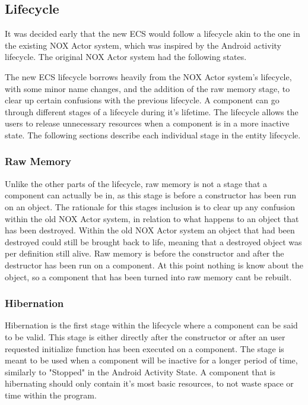 \subsection{Lifecycle}
It was decided early that the new ECS would follow a lifecycle akin to the one in the existing NOX Actor system,
which was inspired by the Android activity lifecycle. \cite{android_activity_lifecycle} 
The original NOX Actor system had the following states.

The new ECS lifecycle borrows heavily from the NOX Actor system's lifecycle, with some minor name changes,
and the addition of the raw memory stage, to clear up certain confusions with the previous lifecycle.
A component can go through different stages of a lifecycle during it's lifetime.
The lifecycle allows the users to release unnecessary resources when a component is in a more inactive state.
The following sections describe each individual stage in the entity lifecycle.

\subsubsection{Raw Memory}
Unlike the other parts of the lifecycle, raw memory is not a stage that a component can actually be in,
as this stage is before a constructor has been run on an object.
The rationale for this stages inclusion is to clear up any confusion within the old NOX Actor system,
in relation to what happens to an object that has been destroyed.
Within the old NOX Actor system an object that had been destroyed could still be brought back to life,
meaning that a destroyed object was per definition still alive.
Raw memory is before the constructor and after the destructor has been run on a component.
At this point nothing is know about the object, so a component that has been turned into raw memory cant be rebuilt.

\subsubsection{Hibernation}
Hibernation is the first stage within the lifecycle where a component can be said to be valid.
This stage is either directly after the constructor or after an  user requested initialize function has been executed on a component.
The stage is meant to be used when a component will be inactive for a longer period of time, similarly to "Stopped" in the Android Activity State.\cite[Activity state and ejection from memory]{android_activity_lifecycle}
A component that is hibernating should only contain it's most basic resources, to not waste space or time within the program.

